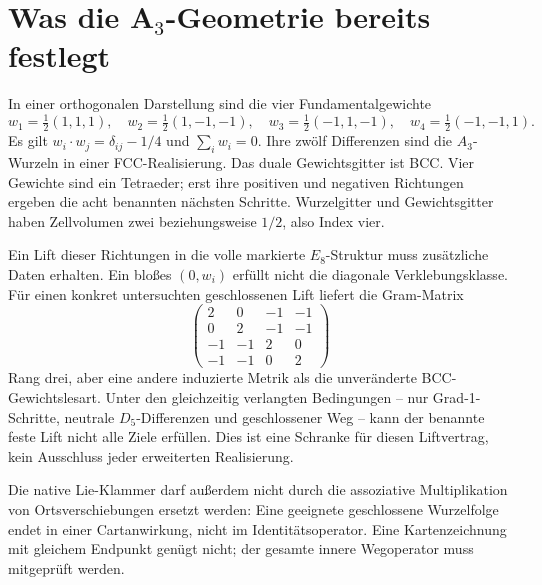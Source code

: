 \section{Was die A\texorpdfstring{$_3$}{3}-Geometrie bereits festlegt}
In einer orthogonalen Darstellung sind die vier Fundamentalgewichte
\begin{equation}
w_1=\tfrac12(1,1,1),\quad w_2=\tfrac12(1,-1,-1),\quad
w_3=\tfrac12(-1,1,-1),\quad w_4=\tfrac12(-1,-1,1).
\end{equation}
Es gilt $w_i\cdot w_j=\delta_{ij}-1/4$ und $\sum_iw_i=0$. Ihre zwölf Differenzen sind die $A_3$-Wurzeln in einer FCC-Realisierung. Das duale Gewichtsgitter ist BCC. Vier Gewichte sind ein Tetraeder; erst ihre positiven und negativen Richtungen ergeben die acht benannten nächsten Schritte. Wurzelgitter und Gewichtsgitter haben Zellvolumen zwei beziehungsweise $1/2$, also Index vier.

Ein Lift dieser Richtungen in die volle markierte $E_8$-Struktur muss zusätzliche Daten erhalten. Ein bloßes $(0,w_i)$ erfüllt nicht die diagonale Verklebungsklasse. Für einen konkret untersuchten geschlossenen Lift liefert die Gram-Matrix
\begin{equation}
\begin{pmatrix}2&0&-1&-1\\0&2&-1&-1\\-1&-1&2&0\\-1&-1&0&2\end{pmatrix}
\end{equation}
Rang drei, aber eine andere induzierte Metrik als die unveränderte BCC-Gewichtslesart. Unter den gleichzeitig verlangten Bedingungen -- nur Grad-1-Schritte, neutrale $D_5$-Differenzen und geschlossener Weg -- kann der benannte feste Lift nicht alle Ziele erfüllen. Dies ist eine Schranke für diesen Liftvertrag, kein Ausschluss jeder erweiterten Realisierung.

Die native Lie-Klammer darf außerdem nicht durch die assoziative Multiplikation von Ortsverschiebungen ersetzt werden: Eine geeignete geschlossene Wurzelfolge endet in einer Cartanwirkung, nicht im Identitätsoperator. Eine Kartenzeichnung mit gleichem Endpunkt genügt nicht; der gesamte innere Wegoperator muss mitgeprüft werden. 

